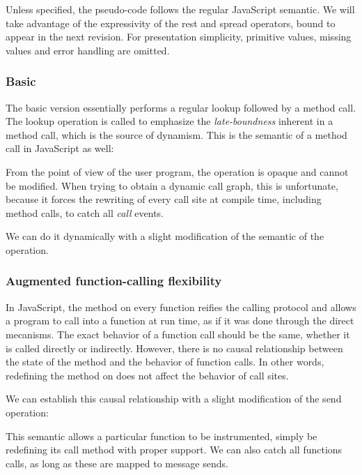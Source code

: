 Unless specified, the pseudo-code follows the regular JavaScript semantic. We
will take advantage of the expressivity of the rest and spread operators, bound
to appear in the next revision. For presentation simplicity, primitive values,
missing values and error handling are omitted.

\subsubsection{Basic}

The basic version essentially performs a regular lookup followed by a method
call. The lookup operation is called  to emphasize the
\textit{late-boundness} inherent in a method call, which is the source of
dynamism. This is the semantic of a method call in JavaScript as well:


From the point of view of the user program, the  operation is opaque
and cannot be modified. When trying to obtain a dynamic call graph, this is
unfortunate, because it forces the rewriting of every call site at compile
time, including method calls, to catch all \textit{call} events.

We can do it dynamically with a slight modification of the semantic of the
operation.

\subsubsection{Augmented function-calling flexibility}

In JavaScript, the  method on every function reifies the calling
protocol and allows a program to call into a function at run time, as if it was
done through the direct mecanisms. The exact behavior of a function call should be
the same, whether it is called directly or indirectly. However, there is no
causal relationship between the state of the  method and the behavior
of function calls. In other words, redefining the  method on
 does not affect the behavior of call sites.

We can establish this causal relationship with a slight modification of the
send operation:


This semantic allows a particular function to be instrumented, simply be
redefining its call method with proper support. We can also catch all functions
calls, as long as these are mapped to message sends.

